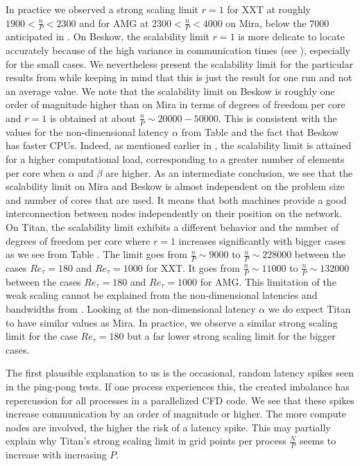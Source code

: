 \documentclass{sig-alternate}
\begin{document}
In practice we observed a strong scaling limit $r=1$ for XXT at roughly $1900<
\frac{n}{P} < 2300$ and for AMG at $2300<\frac{n}{P}<4000$ on Mira, below the $7000$
anticipated in \cite{fischer:scaling}. On Beskow, the scalability limit $r=1$ is 
more delicate to locate accurately because 
of the high variance in communication times (see ), 
especially for the small cases. We nevertheless present the scalability limit for 
the particular results from  while keeping in mind that
this is just the result for one run and not an average value. We note that
the scalability limit on Beskow is roughly one order of magnitude higher than on 
Mira in terms of degrees of freedom per core and $r=1$ is obtained at about 
$\frac{n}{P} \sim 20000 - 50000$. This is consistent with the values for the
non-dimensional latency $\alpha$ %
from Table  
and the fact that Beskow has faster CPUs. Indeed, as mentioned earlier in , 
the scalability limit is attained for a higher computational load, 
corresponding to a greater number of elements per core when $\alpha$ and $\beta$ are higher. 
As an intermediate conclusion, we see that the scalability limit on Mira and Beskow
is almost independent on the problem size and number of cores that are used. It means
that both machines provide a good interconnection between nodes independently
on their position on the network.
On Titan, the scalability limit exhibits a different behavior and the number of degrees of freedom per core where
$r=1$ increases significantly with bigger cases as we see from Table .
 The limit goes from $\frac{n}{P} \sim 9000$ to $\frac{n}{P} \sim 228000$ between 
the cases $Re_{\tau}=180$ and $Re_{\tau}=1000$ for XXT. It goes from $\frac{n}{P} 
\sim 11000$ to $\frac{n}{P} \sim 132000$ between the cases $Re_{\tau}=180$ and 
$Re_{\tau}=1000$ for AMG. This limitation of the weak scaling cannot be explained 
from the non-dimensional latencies and bandwidths from . 
Looking at the non-dimensional latency $\alpha$ we do expect Titan to have similar values as Mira. 
In practice, we observe a similar strong scaling limit for the case $Re_{\tau} = 180$
but a far lower strong scaling limit for the bigger cases. 

The first plausible explanation to us is the occasional, random latency spikes seen in the ping-pong tests. If
one process experiences this, the created imbalance has repercussion for all
processes in a parallelized CFD code. We see that these spikes increase communication by
an order of magnitude or higher. The more compute nodes are involved, the higher
the risk of a latency spike. This may partially explain why Titan's strong
scaling limit in grid points per process $\frac{N}{P}$ seems to increase with increasing $P$.
\end{document}
